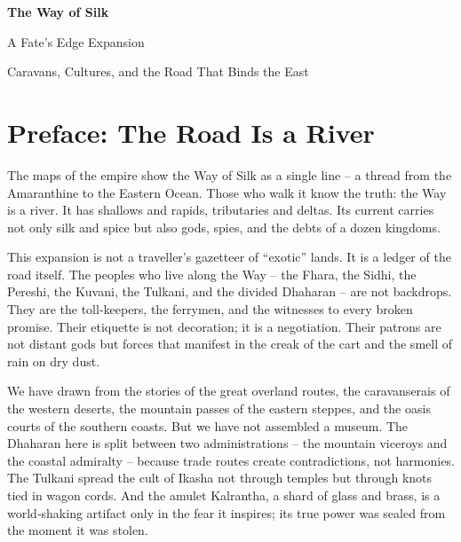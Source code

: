 \documentclass[11pt]{book}
\begin{document}
\frontmatter
\begin{titlepage}
\centering
\vspace*{2cm}
{\huge\bfseries The Way of Silk\par}
\vspace{0.5cm}
{\Large A Fate's Edge Expansion\par}
\vspace{2cm}
{\large Caravans, Cultures, and the Road That Binds the East\par}
\vspace{1.5cm}
\vfill
\end{titlepage}

\tableofcontents

\mainmatter

\chapter*{Preface: The Road Is a River}

The maps of the empire show the Way of Silk as a single line -- a thread from the Amaranthine to the Eastern Ocean. Those who walk it know the truth: the Way is a river. It has shallows and rapids, tributaries and deltas. Its current carries not only silk and spice but also gods, spies, and the debts of a dozen kingdoms.

This expansion is not a traveller's gazetteer of “exotic” lands. It is a ledger of the road itself. The peoples who live along the Way -- the Fhara, the Sidhi, the Pereshi, the Kuvani, the Tulkani, and the divided Dhaharan -- are not backdrops. They are the toll‑keepers, the ferrymen, and the witnesses to every broken promise. Their etiquette is not decoration; it is a negotiation. Their patrons are not distant gods but forces that manifest in the creak of the cart and the smell of rain on dry dust.

We have drawn from the stories of the great overland routes, the caravanserais of the western deserts, the mountain passes of the eastern steppes, and the oasis courts of the southern coasts. But we have not assembled a museum. The Dhaharan here is split between two administrations -- the mountain viceroys and the coastal admiralty -- because trade routes create contradictions, not harmonies. The Tulkani spread the cult of Ikasha not through temples but through knots tied in wagon cords. And the amulet Kalrantha, a shard of glass and brass, is a world‑shaking artifact only in the fear it inspires; its true power was sealed from the moment it was stolen.
\end{document}
